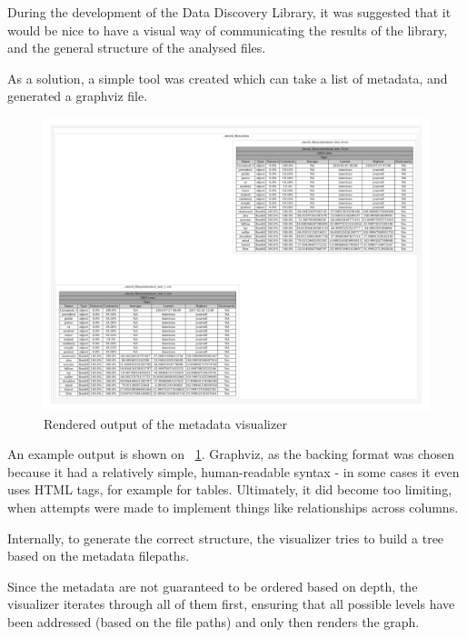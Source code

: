 During the development of the Data Discovery Library, it was suggested that it would be
nice to have a visual way of communicating the results of the library,
and the general structure of the analysed files.

As a solution, a simple tool was created which can take a list of metadata, and
generated a graphviz file.

\begin{figure}[H]
    \centering
    \includegraphics[width=12cm]{figures/metadata_visualization/visualized-1}
    \caption{Rendered output of the metadata visualizer}
    \label{fig:metadata_vis_fig_1}
\end{figure}


An example output is shown on ~\ref{fig:metadata_vis_fig_1}.
Graphviz, as the backing format was chosen because it had a relatively simple,
human-readable syntax - in some cases it even uses HTML tags, for example for tables.
Ultimately, it did become too limiting, when attempts were made
to implement things like relationships across columns.

Internally, to generate the correct structure, the visualizer tries
to build a tree based on the metadata filepaths.

Since the metadata are not guaranteed to be ordered based on depth, the visualizer
iterates through all of them first, ensuring that all possible levels have been addressed
(based on the file paths) and only then renders the graph.



